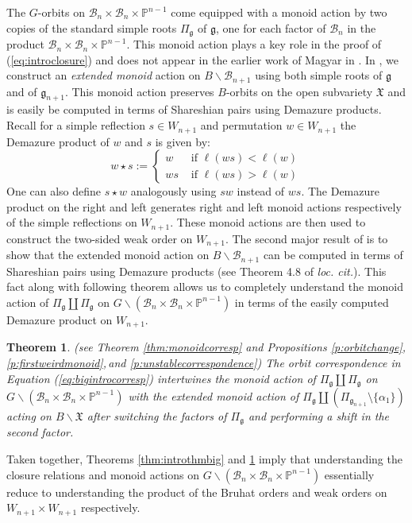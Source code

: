 \documentclass[12pt]{amsart}
\numberwithin{equation}{section}
\newtheorem{thm}{Theorem}[section]
\newcommand{\fg}{\mbox{${\mathfrak g}$}}
\newcommand{\B}{\mathcal{B}}
\begin{document}
 The $G$-orbits on $\B_{n}\times\B_{n}\times\mathbb{P}^{n-1}$ come equipped with a monoid action by two copies of the standard simple roots $\Pi_{\fg}$ of $\fg$, one for each factor of $\B_{n}$ in the product $\B_{n}\times\B_{n}\times\mathbb{P}^{n-1}$.  This monoid action plays a key role in the proof of (\ref{eq:introclosure}) and does not appear in the earlier work of Magyar in \cite{Magyar}.  In \cite{CE21I}, we construct an \emph{extended monoid} action on $B\backslash\B_{n+1}$ using both simple roots of $\fg$ and of $\fg_{n+1}$.  This monoid action preserves $B$-orbits on the open subvariety $\mathfrak{X}$ and is easily be computed in terms of Shareshian pairs using Demazure products.  Recall for a simple reflection $s\in W_{n+1}$ and permutation $w\in W_{n+1}$ the Demazure product of $w$ and $s$ is given by:
\begin{equation}\label{eq:introrightDem}
w\star s:=\left\{ \begin{array}{ll} w & \text{ if } \ell(ws)< \ell(w) \\
ws & \text{ if } \ell(ws)>\ell(w) \end{array} \right.
\end{equation}
One can also define $s\star w$ analogously using $sw$ instead of $ws$.  
The Demazure product on the right and left generates right and left monoid actions respectively of the simple reflections on $W_{n+1}$.  These monoid actions are then used to construct the two-sided weak order on $W_{n+1}$.  The second major result of \cite{Shpairs} is to show that the extended monoid action on $B\backslash\B_{n+1}$ can be computed in terms of Shareshian pairs using Demazure products (see Theorem 4.8 of \emph{loc. cit.}).  This fact along with following theorem allows us to completely understand the monoid action of $\Pi_{\fg}\coprod\Pi_{\fg}$ on $G\backslash(\B_{n}\times\B_{n}\times\mathbb{P}^{n-1})$ in terms of the easily computed Demazure product on $W_{n+1}$.  

 
\begin{thm}\label{thm:intromonoid}\emph{(see Theorem \ref{thm:monoidcorresp} and  Propositions \ref{p:orbitchange}, \ref{p:firstweirdmonoid},\,and \ref{p:unstablecorrespondence})}
The orbit correspondence in Equation (\ref{eq:bigintrocorresp}) intertwines the monoid action of $\Pi_{\fg}\coprod\Pi_{\fg}$ on $G\backslash(\B_{n}\times\B_{n}\times\mathbb{P}^{n-1})$ with the extended monoid action of $\Pi_{\fg}\coprod(\Pi_{\fg_{n+1}}\setminus\{\alpha_{1}\})$ acting on $B\backslash\mathfrak{X}$ after switching the factors of $\Pi_{\fg}$ and performing a shift in the second factor. 
\end{thm} 
\noindent Taken together, Theorems \ref{thm:introthmbig} and \ref{thm:intromonoid} imply that understanding the closure relations and monoid actions on $G\backslash (\B_{n}\times\B_{n}\times\mathbb{P}^{n-1})$ essentially reduce to understanding the product of the Bruhat orders and weak orders on $W_{n+1}\times W_{n+1}$ respectively. 
\end{document}
